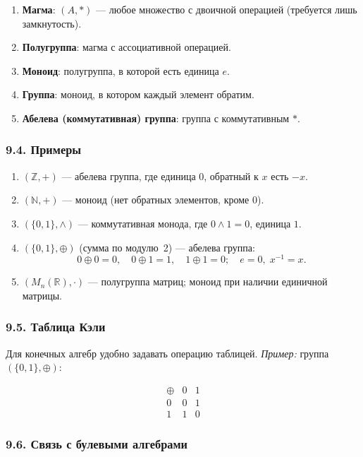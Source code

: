 \begin{enumerate}[label=\arabic*)]
  \item \textbf{Магма}: $(A,*)$ — любое множество с двоичной операцией (требуется лишь замкнутость).
  \item \textbf{Полугруппа}: магма с ассоциативной операцией.
  \item \textbf{Моноид}: полугруппа, в которой есть единица $e$.
  \item \textbf{Группа}: моноид, в котором каждый элемент обратим.
  \item \textbf{Абелева (коммутативная) группа}: группа с коммутативным $*$.
\end{enumerate}

\subsubsection{9.4. Примеры}

\begin{enumerate}[label=\arabic*)]
  \item $(\mathbb{Z}, +)$ — абелева группа, где единица $0$, обратный к $x$ есть $-x$.
  \item $(\mathbb{N}, +)$ — моноид (нет обратных элементов, кроме $0$).
  \item $(\{0,1\}, \wedge)$ — коммутативная монода, где $0\wedge1=0$, единица $1$.
  \item $(\{0,1\}, \oplus)$ (сумма по модулю 2) — абелева группа:  
    \[
      0\oplus0=0,\quad 0\oplus1=1,\quad1\oplus1=0;
      \quad e=0,\;x^{-1}=x.
    \]
  \item $(M_n(\mathbb{R}), \cdot)$ — полугруппа матриц; моноид при наличии единичной матрицы.
\end{enumerate}

\subsubsection{9.5. Таблица Кэли}

Для конечных алгебр удобно задавать операцию таблицей.  
\emph{Пример:} группа $(\{0,1\},\oplus)$:

\[
\begin{array}{c|cc}
\oplus & 0 & 1 \\ \hline
0 & 0 & 1 \\
1 & 1 & 0
\end{array}
\]

\subsubsection{9.6. Связь с булевыми алгебрами}

